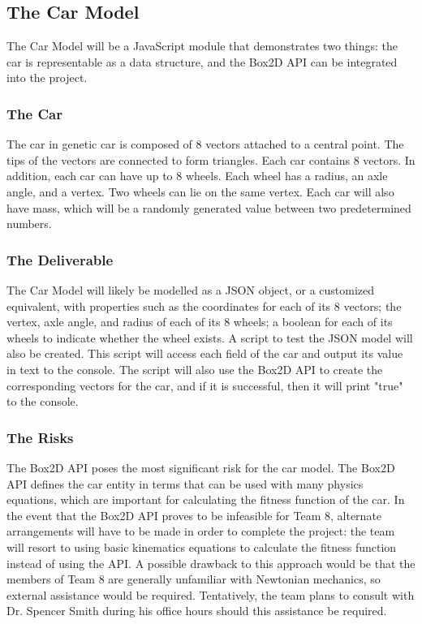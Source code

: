 \documentclass{article}
\begin{document}
\subsection{The Car Model}
The Car Model will be a JavaScript module that demonstrates two things: the car 
is representable as a data structure, and the Box2D API can be integrated into 
the project. 

\subsubsection{The Car}
The car in genetic car is composed of 8 vectors attached to a central point. The 
tips of the vectors are connected to form triangles. Each car contains 8 
vectors. In addition, each car can have up to 8 wheels. Each wheel has a radius, 
an axle angle, and a vertex. Two wheels can lie on the same vertex. Each car 
will also have mass, which will be a randomly generated value between two 
predetermined numbers.

\subsubsection{The Deliverable}
The Car Model will likely be modelled as a JSON object, or a customized 
equivalent, with properties such as the coordinates for each of its 8 vectors; 
the vertex, axle angle, and radius of each of its 8 wheels; a boolean for each 
of its wheels to indicate whether the wheel exists. A script to test the JSON 
model will also be created. This script will access each field of the car and 
output its value in text to the console. The script will also use the Box2D API 
to create the corresponding vectors for the car, and if it is successful, then 
it will print "true" to the console.

\subsubsection{The Risks}
The Box2D API poses the most significant risk for the car model. The Box2D API defines the car entity in terms that can be used with many physics equations, which are important for calculating the fitness function of the car. In the event that the Box2D API proves to be infeasible for Team 8, alternate arrangements will have to be made in order to complete the project: the team will resort to using basic kinematics equations to calculate the fitness function instead of using the API. A possible drawback to this approach would be that the members of Team 8 are generally unfamiliar with Newtonian mechanics, so external assistance would be required. Tentatively, the team plans to consult with Dr. Spencer Smith during his office hours should this assistance be required. 
\end{document}
